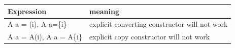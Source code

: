 \documentclass[a4paper,11pt,twoside]{book}
\newcommand{\tophline}{\hline }
\newcommand{\bottomhline}{\\ \hline }
\newcommand{\tophline}{ }
\newcommand{\bottomhline}{ }
\begin{document}
\begin{itemize}
\begin{tabular}{|p{}|p{}|}
	\tophline
	Expression & meaning \\
	\tophline
	A a = (i), A a=\{i\} & explicit converting constructor will not work \\
	\tophline
	A a = A(i), A a = A\{i\} & explicit copy constructor will not work 
	\bottomhline
\end{tabular}




\end{itemize}
\end{document}
